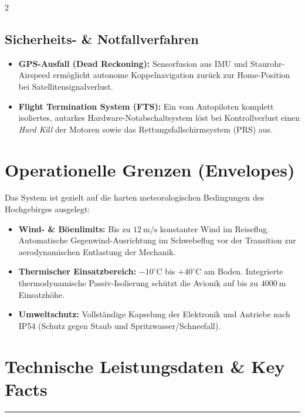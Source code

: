\documentclass[10pt,a4paper]{article}
\begin{document}
\begin{multicols}{2}
\subsection{Sicherheits- \& Notfallverfahren}
\begin{itemize}
    \item \textbf{GPS-Ausfall (Dead Reckoning):} Sensorfusion aus IMU und Staurohr-Airspeed ermöglicht autonome Koppelnavigation zurück zur Home-Position bei Satellitensignalverlust.
    \item \textbf{Flight Termination System (FTS):} Ein vom Autopiloten komplett isoliertes, autarkes Hardware-Notabschaltsystem löst bei Kontrollverlust einen \textit{Hard Kill} der Motoren sowie das Rettungsfallschirmsystem (PRS) aus.
\end{itemize}

\section{Operationelle Grenzen (Envelopes)}
Das System ist gezielt auf die harten meteorologischen Bedingungen des Hochgebirges ausgelegt:
\begin{itemize}
    \item \textbf{Wind- \& Böenlimits:} Bis zu $\SI{12}{\m/\s}$ konstanter Wind im Reiseflug. Automatische Gegenwind-Ausrichtung im Schwebeflug vor der Transition zur aerodynamischen Entlastung der Mechanik.
    \item \textbf{Thermischer Einsatzbereich:} $-10^\circ\text{C}$ bis $+40^\circ\text{C}$ am Boden. Integrierte thermodynamische Passiv-Isolierung schützt die Avionik auf bis zu $\SI{4000}{\m}$ Einsatzhöhe.
    \item \textbf{Umweltschutz:} Vollständige Kapselung der Elektronik und Antriebe nach IP54 (Schutz gegen Staub und Spritzwasser/Schneefall).
\end{itemize}

\end{multicols}

\vspace{0.1cm}
\section{Technische Leistungsdaten \& Key Facts}
\rule{\textwidth}{0.5pt}
\vspace{0.1cm}
\end{document}
